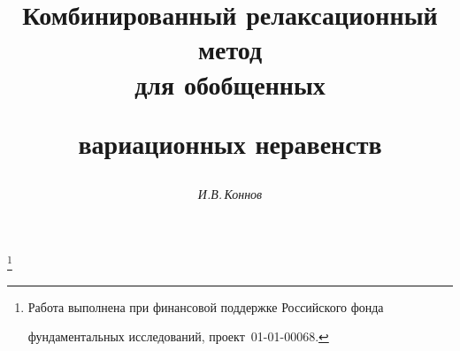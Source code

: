 




%


\newcommand{\tts}[1]{}










\setcounter{page}{46}















\author{\it И.В.\,Коннов}




\title{Комбинированный релаксационный метод\\ для обобщенных


вариационных неравенств}


\thanks{Работа выполнена при финансовой поддержке Российского фонда


фундаментальных исследований, проект \No\,01-01-00068.}





\date{}




\pagestyle{plain} %







\maketitle


